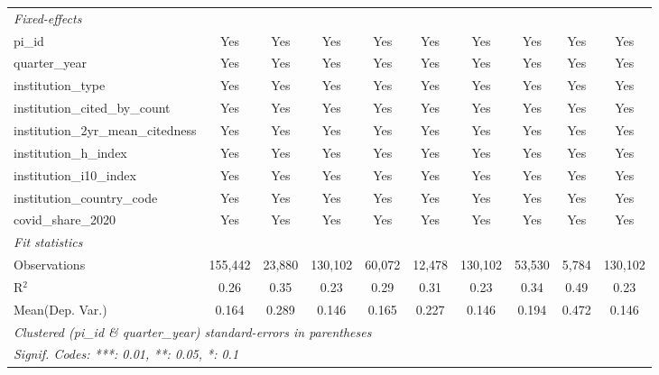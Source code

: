 \begin{tabular}{lccccccccc}
   \midrule
   \emph{Fixed-effects}\\
   pi\_id                                                      & Yes            & Yes            & Yes            & Yes            & Yes            & Yes            & Yes            & Yes            & Yes\\  
   quarter\_year                                               & Yes            & Yes            & Yes            & Yes            & Yes            & Yes            & Yes            & Yes            & Yes\\  
   institution\_type                                           & Yes            & Yes            & Yes            & Yes            & Yes            & Yes            & Yes            & Yes            & Yes\\  
   institution\_cited\_by\_count                               & Yes            & Yes            & Yes            & Yes            & Yes            & Yes            & Yes            & Yes            & Yes\\  
   institution\_2yr\_mean\_citedness                           & Yes            & Yes            & Yes            & Yes            & Yes            & Yes            & Yes            & Yes            & Yes\\  
   institution\_h\_index                                       & Yes            & Yes            & Yes            & Yes            & Yes            & Yes            & Yes            & Yes            & Yes\\  
   institution\_i10\_index                                     & Yes            & Yes            & Yes            & Yes            & Yes            & Yes            & Yes            & Yes            & Yes\\  
   institution\_country\_code                                  & Yes            & Yes            & Yes            & Yes            & Yes            & Yes            & Yes            & Yes            & Yes\\  
   covid\_share\_2020                                          & Yes            & Yes            & Yes            & Yes            & Yes            & Yes            & Yes            & Yes            & Yes\\  
   \midrule
   \emph{Fit statistics}\\
   Observations                                                & 155,442        & 23,880         & 130,102        & 60,072         & 12,478         & 130,102        & 53,530         & 5,784          & 130,102\\  
   R$^2$                                                       & 0.26           & 0.35           & 0.23           & 0.29           & 0.31           & 0.23           & 0.34           & 0.49           & 0.23\\  
Mean(Dep. Var.) & 0.164 & 0.289 & 0.146 & 0.165 & 0.227 & 0.146 & 0.194 & 0.472 & 0.146 \\
   \midrule \midrule
   \multicolumn{10}{l}{\emph{Clustered (pi\_id \& quarter\_year) standard-errors in parentheses}}\\
   \multicolumn{10}{l}{\emph{Signif. Codes: ***: 0.01, **: 0.05, *: 0.1}}\\
\end{tabular}
\par\endgroup
